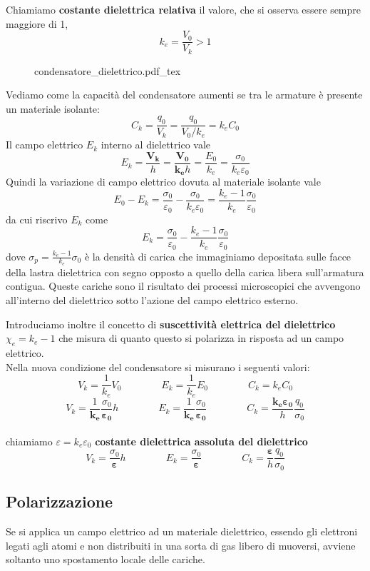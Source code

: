\documentclass[x11names]{report}
\newcommand{\incfig}[1]{%
	{#1.pdf_tex}
}
\begin{document}
Chiamiamo \textbf{costante dielettrica relativa} il valore, che si osserva essere sempre maggiore di 1,
\[
k_e = \frac{V_0}{V_k} > 1
\] 
\begin{figure}[H]
	\centering
	\incfig{condensatore_dielettrico}
\end{figure}
Vediamo come la capacità del condensatore aumenti se tra le armature è presente un materiale isolante:
\[
C_k = \frac{q_0}{V_k} = \frac{q_0}{V_0/k_e} = k_eC_0
\]
Il campo elettrico \(E_k\) interno al dielettrico vale
\[
E_k = \frac{\boldsymbol{V_k}}{h} = \frac{\boldsymbol{V_0}}{\boldsymbol{k_e}h} = \frac{E_0}{k_e} = \frac{\sigma_0}{k_e\varepsilon_0}
\]
Quindi la variazione di campo elettrico dovuta al materiale isolante vale
\[
E_0 - E_{k} = \frac{\sigma_0}{\varepsilon_0} -  \frac{\sigma_0}{k_e\varepsilon_0} = \frac{k_e - 1}{k_e}\frac{\sigma_0}{\varepsilon_0}
\]
da cui riscrivo \(E_k\) come 
\[
E_k = \frac{\sigma_0}{\varepsilon_0} - \frac{k_e - 1}{k_e}\frac{\sigma_0}{\varepsilon_0}
\]
dove \(\sigma_p =  \frac{k_e - 1}{k_e}\sigma_0\) è la densità di carica che immaginiamo depositata sulle facce della lastra dielettrica con segno opposto a quello della carica libera sull'armatura contigua. Queste cariche sono il risultato dei processi microscopici che avvengono all'interno del dielettrico sotto l'azione del campo elettrico esterno. 

Introduciamo inoltre il concetto di \textbf{suscettività elettrica del dielettrico} \(\chi_e = k_e - 1\) che  misura di quanto questo si polarizza in risposta ad un campo elettrico. \\

\noindent
Nella nuova condizione del condensatore si misurano i seguenti valori:
\[
V_k = \frac{1}{k_e}V_0 \qquad\qquad E_k = \frac{1}{k_e}E_0 \qquad\qquad C_k = k_eC_0
\]
\[
V_k = \frac{1}{\boldsymbol{k_e}}\frac{\sigma_0}{\boldsymbol{\varepsilon_0}}h \qquad\qquad E_k = \frac{1}{\boldsymbol{k_e}}\frac{\sigma_0}{\boldsymbol{\varepsilon_0}} \qquad\qquad C_k = \frac{\boldsymbol{k_e\varepsilon_0}}{h}\frac{q_0}{\sigma_0}
\]\\
chiamiamo \(\varepsilon = k_e\varepsilon_0\) \textbf{costante  dielettrica assoluta del dielettrico}
\[
V_k = \frac{\sigma_0}{\boldsymbol{\varepsilon}}h \qquad\qquad E_k = \frac{\sigma_0}{\boldsymbol{\varepsilon}} \qquad\qquad C_k = \frac{\boldsymbol{\varepsilon}}{h}\frac{q_0}{\sigma_0}
\]
\subsection{Polarizzazione}
Se si applica un campo elettrico ad un materiale dielettrico, essendo gli elettroni legati agli atomi e non distribuiti in una sorta di gas libero di muoversi, avviene soltanto uno spostamento locale delle cariche.
\end{document}
